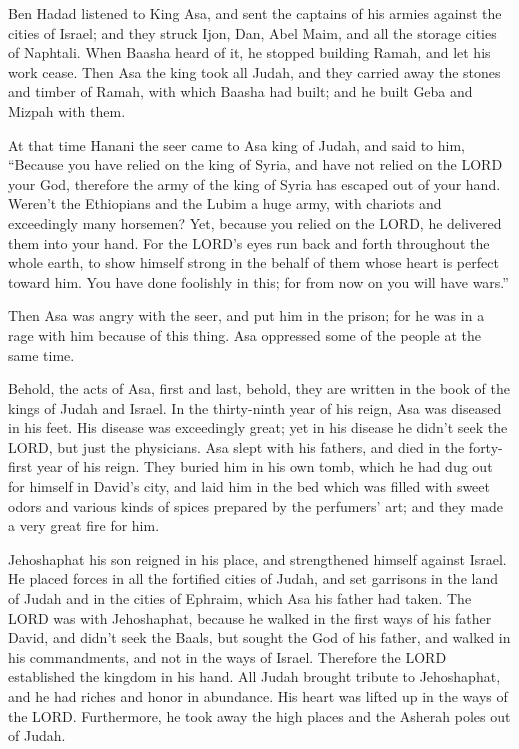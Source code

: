 \myverse{}Ben Hadad listened to King Asa, and sent the captains of his armies
against the cities of Israel; and they struck Ijon, Dan, Abel Maim, and all the storage cities of Naphtali.
\myverse{}When Baasha heard of it, he stopped building Ramah, and let his work cease.
\myverse{}Then Asa the king took all Judah, and they carried away the stones and timber
of Ramah, with which Baasha had built; and he built Geba and Mizpah with them.

\myverse{}At that time Hanani the seer came to Asa king of Judah, and said
to him, “Because you have relied on the king of Syria, and have not relied on the LORD your God, therefore
the army of the king of Syria has escaped out of your hand.
\myverse{}Weren’t the Ethiopians and the Lubim a huge army, with chariots and exceedingly
many horsemen? Yet, because you relied on the LORD, he delivered them into your hand.
\myverse{}For the LORD’s eyes run back and forth throughout the whole earth, to show
himself strong in the behalf of them whose heart is perfect toward him. You have done foolishly in this;
for from now on you will have wars.”

\myverse{}Then Asa was angry with the seer, and put him in the prison;
for he was in a rage with him because of this thing. Asa oppressed some of the people at the same time.

\myverse{}Behold, the acts of Asa, first and last, behold, they are written
in the book of the kings of Judah and Israel.
\myverse{}In the thirty-ninth year of his reign, Asa was diseased in his feet. His
disease was exceedingly great; yet in his disease he didn’t seek the LORD, but just the physicians.
\myverse{}Asa slept with his fathers, and died in the forty-first year of his reign.
\myverse{}They buried him in his own tomb, which he had dug out for himself in David’s
city, and laid him in the bed which was filled with sweet odors and various kinds of spices prepared by
the perfumers’ art; and they made a very great fire for him.


\mychapter{} \myverse*{}Jehoshaphat his son reigned in his place, and strengthened himself
against Israel.
\myverse{}He placed forces in all the fortified cities of Judah, and set garrisons in
the land of Judah and in the cities of Ephraim, which Asa his father had taken.
\myverse{}The LORD was with Jehoshaphat, because he walked in the first ways of his father
David, and didn’t seek the Baals,
\myverse{}but sought the God of his father, and walked in his commandments, and not in
the ways of Israel.
\myverse{}Therefore the LORD established the kingdom in his hand. All Judah brought tribute
to Jehoshaphat, and he had riches and honor in abundance.
\myverse{}His heart was lifted up in the ways of the LORD. Furthermore, he took away
the high places and the Asherah poles out of Judah.

